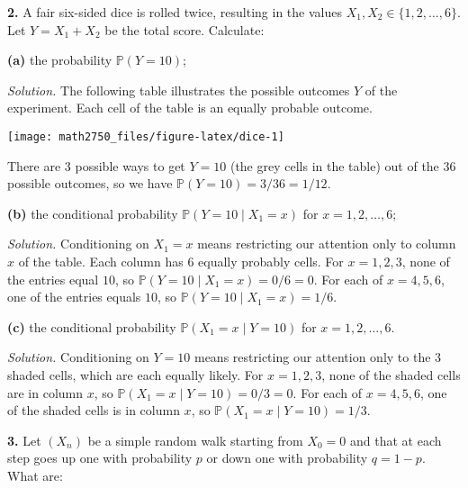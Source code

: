 \documentclass[
  a4paper,
]{article}
\theoremstyle{definition}
\theoremstyle{definition}
\theoremstyle{definition}
\theoremstyle{remark}
\begin{document}
\textbf{2.} A fair six-sided dice is rolled twice, resulting in the
values \(X_1, X_2 \in \{1, 2, \ldots, 6\}\). Let \(Y = X_1 + X_2\) be the total score.
Calculate:

\textbf{(a)} the probability \(\mathbb P(Y = 10)\);

\begin{myanswers}

\emph{Solution.} The following table illustrates the possible outcomes \(Y\) of the experiment. Each cell of the table is an equally probable outcome.

\begin{center}\texttt{[image: math2750\_files/figure-latex/dice-1]} \end{center}

There are 3 possible ways to get \(Y=10\) (the grey cells in the table) out of the \(36\) possible outcomes, so we have \(\mathbb P(Y = 10) = 3/36 = 1/12\).

\end{myanswers}

\textbf{(b)} the conditional probability \(\mathbb P(Y=10 \mid X_1=x)\) for \(x=1, 2, \ldots, 6\);

\begin{myanswers}

\emph{Solution.} Conditioning on \(X_1 = x\) means restricting our attention only to column \(x\) of the table. Each column has \(6\) equally probably cells. For \(x=1,2,3\), none of the entries equal \(10\), so \(\mathbb P(Y=10 \mid X_1=x) = 0/6 = 0\). For each of \(x=4,5,6\), one of the entries equals \(10\), so \(\mathbb P(Y=10 \mid X_1=x) = 1/6\).

\end{myanswers}

\textbf{(c)} the conditional probability \(\mathbb P(X_1=x \mid Y=10)\) for \(x=1, 2, \ldots, 6\).

\begin{myanswers}

\emph{Solution.} Conditioning on \(Y =10\) means restricting our attention only to the \(3\) shaded cells, which are each equally likely. For \(x=1,2,3\), none of the shaded cells are in column \(x\), so \(\mathbb P(X_1=x \mid Y=10) = 0/3 = 0\). For each of \(x=4,5,6\), one of the shaded cells is in column \(x\), so \(\mathbb P(X_1=x \mid Y=10) = 1/3\).

\end{myanswers}

\textbf{3.} Let \((X_n)\) be a simple random walk starting from \(X_0 = 0\) and that at each step goes up one with probability \(p\) or down one with probability \(q = 1-p\). What are:
\end{document}
